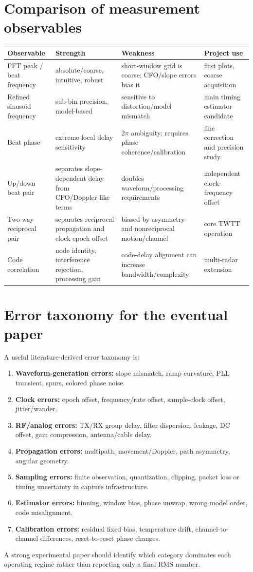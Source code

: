 \documentclass[11pt]{article}
\begin{document}
\section{Comparison of measurement observables}
\begin{longtable}{@{}p{}p{}p{}p{}@{}}
\toprule Observable & Strength & Weakness & Project use \\ \midrule
FFT peak / beat frequency & absolute/coarse, intuitive, robust & short-window grid is coarse; CFO/slope errors bias it & first plots, coarse acquisition \\
Refined sinusoid frequency & sub-bin precision, model-based & sensitive to distortion/model mismatch & main timing estimator candidate \\
Beat phase & extreme local delay sensitivity & $2\pi$ ambiguity; requires phase coherence/calibration & fine correction and precision study \\
Up/down beat pair & separates slope-dependent delay from CFO/Doppler-like terms & doubles waveform/processing requirements & independent clock-frequency offset \\
Two-way reciprocal pair & separates reciprocal propagation and clock epoch offset & biased by asymmetry and nonreciprocal motion/channel & core TWTT operation \\
Code correlation & node identity, interference rejection, processing gain & code-delay alignment can increase bandwidth/complexity & multi-radar extension \\
\bottomrule
\end{longtable}

\section{Error taxonomy for the eventual paper}
A useful literature-derived error taxonomy is:
\begin{enumerate}
\item \textbf{Waveform-generation errors:} slope mismatch, ramp curvature, PLL transient, spurs, colored phase noise.
\item \textbf{Clock errors:} epoch offset, frequency/rate offset, sample-clock offset, jitter/wander.
\item \textbf{RF/analog errors:} TX/RX group delay, filter dispersion, leakage, DC offset, gain compression, antenna/cable delay.
\item \textbf{Propagation errors:} multipath, movement/Doppler, path asymmetry, angular geometry.
\item \textbf{Sampling errors:} finite observation, quantization, clipping, packet loss or timing uncertainty in capture infrastructure.
\item \textbf{Estimator errors:} binning, window bias, phase unwrap, wrong model order, code misalignment.
\item \textbf{Calibration errors:} residual fixed bias, temperature drift, channel-to-channel differences, reset-to-reset phase changes.
\end{enumerate}
A strong experimental paper should identify which category dominates each operating regime rather than reporting only a final RMS number.
\end{document}
